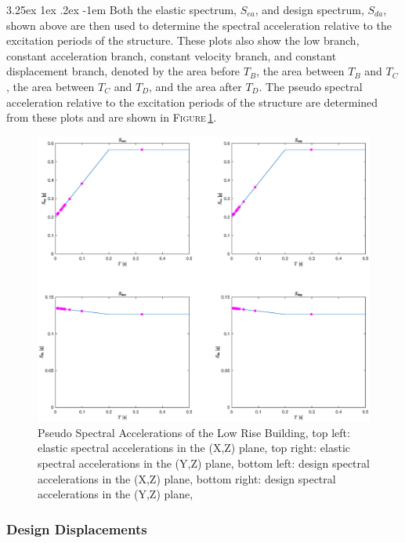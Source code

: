 \documentclass[11pt,a4paper,titlepage]{report}
\makeatletter
\renewcommand\paragraph{\@startsection{paragraph}{5}{\z@}%
  {3.25ex \@plus1ex \@minus.2ex}%
  {-1em}%
  {\normalfont\normalsize\bfseries}}
\makeatother
\begin{document}
\paragraph{}Both the elastic spectrum, $S_{ea}$, and design spectrum, $S_{da}$, shown above are then used to determine the spectral acceleration relative to the excitation periods of the structure. These plots also show the low branch, constant acceleration branch, constant velocity branch, and constant displacement branch, denoted by the area before $T_B$, the area between $T_B$ and $T_C$, the area between $T_C$ and $T_D$, and the area after $T_D$. The pseudo spectral acceleration relative to the excitation periods of the structure are determined from these plots and are shown in \textsc{Figure}\,\ref{fig:I.2 - LR - spectral accelerations}.
\begin{figure}
    \centering
    \includegraphics[width=16cm]{Spectral_Accelerations_and_Displacements.eps}
    \caption{Pseudo Spectral Accelerations of the Low Rise Building, top left: elastic spectral accelerations in the (X,Z) plane, top right: elastic spectral accelerations in the (Y,Z) plane, bottom left: design spectral accelerations in the (X,Z) plane, bottom right: design spectral accelerations in the (Y,Z) plane,}
    \label{fig:I.2 - LR - spectral accelerations}
\end{figure}
\subsubsection{Design Displacements}
\end{document}
